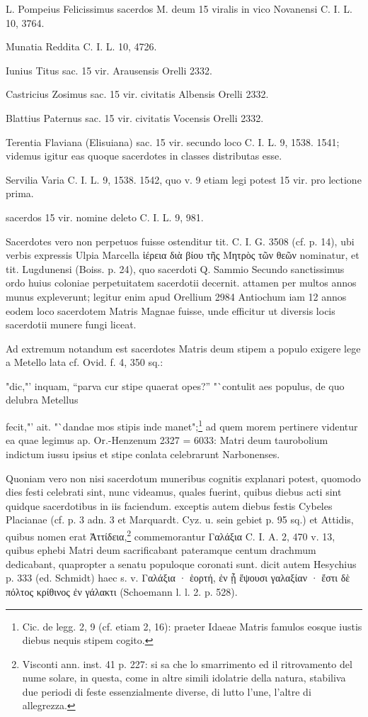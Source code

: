 \documentclass[a4paper, 11pt, oneside, polutonikogreek, german]{article}
\begin{document}
L. Pompeius Felicissimus sacerdos M. deum 15 viralis in vico Novanensi C. I. L. 10, 3764.

Munatia Reddita C. I. L. 10, 4726.

Iunius Titus sac. 15 vir. Arausensis Orelli 2332.

Castricius Zosimus sac. 15 vir. civitatis Albensis Orelli 2332.

Blattius Paternus sac. 15 vir. civitatis Vocensis Orelli 2332.

Terentia Flaviana (Elisuiana) sac. 15 vir. secundo loco C. I. L. 9, 1538. 1541; videmus igitur eas quoque sacerdotes in classes distributas esse.

Servilia Varia C. I. L. 9, 1538. 1542, quo v. 9 etiam legi potest 15 vir. pro lectione prima.

sacerdos 15 vir. nomine deleto C. I. L. 9, 981.

Sacerdotes vero non perpetuos fuisse ostenditur tit. C. I. G. 3508 (cf. p. 14), ubi verbis expressis Ulpia Marcella ἱέρεια διὰ βίου τῆς Μητρὸς τῶν θεῶν nominatur, et tit. Lugdunensi (Boiss. p. 24), quo sacerdoti Q. Sammio Secundo sanctissimus ordo huius coloniae perpetuitatem sacerdotii decernit. attamen per multos annos munus expleverunt; legitur enim apud Orellium 2984 Antiochum iam 12 annos eodem loco sacerdotem Matris Magnae fuisse, unde efficitur ut diversis locis sacerdotii munere fungi liceat.

Ad extremum notandum est sacerdotes Matris deum stipem a populo exigere lege a Metello lata cf. Ovid. f. 4, 350 sq.:

"dic,"' inquam, "`parva cur stipe quaerat opes?"'  "`contulit aes populus, de quo delubra Metellus

fecit,"' ait. "`dandae mos stipis inde manet";\footnote{Cic. de legg. 2, 9 (cf. etiam 2, 16): praeter Idaeae Matris famulos eosque iustis diebus nequis stipem cogito.} ad quem morem pertinere videntur ea quae legimus ap. Or.-Henzenum 2327 = 6033: Matri deum taurobolium indictum iussu ipsius et stipe conlata celebrarunt Narbonenses.

Quoniam vero non nisi sacerdotum muneribus cognitis explanari potest, quomodo dies festi celebrati sint, nunc videamus, quales fuerint, quibus diebus acti sint quidque sacerdotibus in iis faciendum. exceptis autem diebus festis Cybeles Placianae (cf. p. 3 adn. 3 et Marquardt. Cyz. u. sein gebiet p. 95 sq.) et Attidis, quibus nomen erat Ἀττίδεια,\footnote{Visconti ann. inst. 41 p. 227: si sa che lo smarrimento ed il ritrovamento del nume solare, in questa, come in altre simili idolatrie della natura, stabiliva due periodi di feste essenzialmente diverse, di lutto l'une, l'altre di allegrezza.} commemorantur Γαλάξια C. I. A. 2, 470 v. 13, quibus ephebi Matri deum sacrificabant pateramque centum drachmum dedicabant, quapropter a senatu populoque coronati sunt. dicit autem Hesychius p. 333 (ed. Schmidt) haec s. v. Γαλάξια · ἑορτή, ἐν ᾗ ἕψουσι γαλαξίαν · ἔστι δὲ πόλτος κρίθινος ἐν γάλακτι (Schoemann l. l. 2. p. 528).
\end{document}
